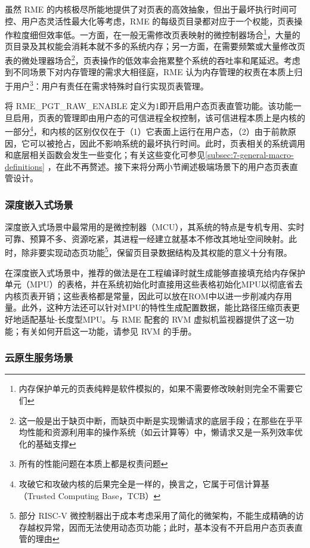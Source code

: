 虽然 RME 的内核极尽所能地提供了对页表的高效抽象，但出于最坏执行时间可控、用户态灵活性最大化等考虑，RME 的每级页目录都对应于一个权能，页表操作粒度细但效率低。一方面，在一般无需修改页表映射的微控制器场合\footnote{内存保护单元的页表纯粹是软件模拟的，如果不需要修改映射则完全不需要它们}，大量的页目录及其权能会消耗本就不多的系统内存；另一方面，在需要频繁或大量修改页表的微处理器场合\footnote{这一般是出于缺页中断，而缺页中断是实现懒请求的底层手段；在那些在乎平均性能和资源利用率的操作系统（如云计算等）中，懒请求又是一系列效率优化的基础支撑}，页表操作的低效率会拖累整个系统的吞吐率和尾延迟。考虑到不同场景下对内存管理的需求大相径庭，RME 认为内存管理的权责在本质上归于用户\footnote{所有的性能问题在本质上都是权责问题}：用户有责任在需求特殊时自行实现页表管理。

将 RME\_PGT\_RAW\_ENABLE 定义为1即开启用户态页表直管功能。该功能一旦启用，页表的管理即由用户态的可信进程全权控制，该可信进程本质上是内核的一部分\footnote{攻破它和攻破内核的后果完全是一样的，换言之，它属于可信计算基（Trusted
  Computing Base，TCB）}，和内核的区别仅仅在于（1）它表面上运行在用户态，（2）由于前款原因，它可以被抢占，因此不影响系统的最坏执行时间。此时，页表相关的系统调用和底层相关函数会发生一些变化；有关这些变化可参见\ref{subsec:7-general-macro-definitions}
，在此不再赘述。接下来将分两小节阐述极端场景下的用户态页表直管设计。

\subsubsection{深度嵌入式场景}\label{subsubsec:9-deep-embedded-scenario}

深度嵌入式场景中最常用的是微控制器（MCU），其系统的特点是专机专用、实时可靠、预算不多、资源吃紧，其进程一经建立就基本不修改其地址空间映射。此时，除非要实现动态页功能\footnote{部分 RISC-V 微控制器出于成本考虑采用了简化的微架构，不能生成精确的访存越权异常，因而无法使用动态页功能；此时，基本没有不开启用户态页表直管的理由}，保留页目录数据结构及其权能的意义十分有限。

在深度嵌入式场景中，推荐的做法是在工程编译时就生成能够直接填充给内存保护单元（MPU）的表格，并在系统初始化时直接用这些表格初始化MPU以彻底省去内核页表开销；这些表格都是常量，因此可以放在ROM中以进一步削减内存用量。此外，这种方法还可以针对MPU的特性生成配置数据，能比路径压缩页表更好地适配基址-长度型MPU。与 RME 配套的 RVM 虚拟机监视器提供了这一功能；有关如何开启这一功能，请参见 RVM 的手册。

\subsubsection{云原生服务场景}\label{subsubsec:9-cloud-native-scenario}

